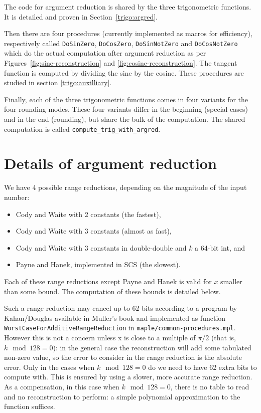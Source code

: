 The code for argument reduction is shared by the three
trigonometric functions. It is detailed and proven in
Section~\ref{trigo:argred}.

Then there are four procedures (currently implemented as macros for
efficiency), respectively called \texttt{DoSinZero},
\texttt{DoCosZero}, \texttt{DoSinNotZero} and \texttt{DoCosNotZero}
which do the actual computation after argument reduction as per
Figures~\ref{fig:sine-reconstruction} and
\ref{fig:cosine-reconstruction}. The tangent function is computed by
dividing the sine by the cosine. These procedures are studied in
section \ref{trigo:auxilliary}.

Finally, each of the three trigonometric functions comes in four
variants for the four rounding modes. These four variants differ in
the beginning (special cases) and in the end (rounding), but share the
bulk of the computation. The shared computation is called
\verb!compute_trig_with_argred!.




\section{Details of argument reduction
\label{trigo:argred}}


We have 4 possible range reductions, depending on the magnitude of the input number:

\begin{itemize}
\item Cody and Waite with 2 constants (the fastest),
\item Cody and Waite with 3 constants (almost as fast),
\item Cody and Waite with 3 constants in double-double and $k$ a
  64-bit int, and 
\item Payne and Hanek, implemented in SCS (the slowest).
\end{itemize}
Each of these range reductions except Payne and Hanek is valid for $x$
smaller than some bound. The computation of these bounds is detailed
below.

Such a range reduction may cancel up to 62 bits according to a program
by Kahan/Douglas available in Muller's book \cite{Muller97} and
implemented as function \texttt{WorstCaseForAdditiveRangeReduction} in
\texttt{maple/common-procedures.mpl}.  However this is not a concern
unless x is close to a multiple of $\pi/2$ (that is, $k \mod 128=0$): in
the general case the reconstruction will add some tabulated non-zero
value, so the error to consider in the range reduction is the absolute
error.  Only in the cases when $k \mod 128=0$ do we need to have 62
extra bits to compute with. This is ensured by using a slower, more
accurate range reduction. As a compensation, in this case when $k \mod
128=0$, there is no table to read and no reconstruction to perform: a
simple polynomial approximation to the function suffices. 

